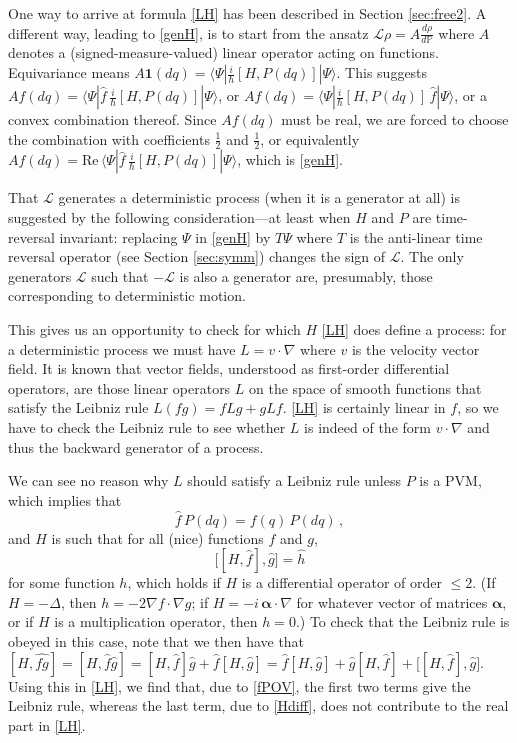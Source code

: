 \documentclass[12pt]{article}
\newcommand{\I}{i} %
\newcommand{\1}{\mathbf{1}} %
\newcommand{\Laplace}{\Delta} %
\renewcommand{\Re}{\mathrm{Re}} %
\renewcommand{\sp}[2]{\langle #1 | #2 \rangle} %
\newcommand{\measure}{\mathbb{P}} %
\newcommand{\generator}{\mathscr{L}} %
\newcommand{\pov}{{P}}%
\newcommand{\valpha}{{\boldsymbol \alpha}}
\begin{document}
  One way to arrive at formula \eqref{LH} has been described in Section
\ref{sec:free2}.  A different way, leading to \eqref{genH}, is to
start from the ansatz $\generator \rho = A\frac{d\rho}{d\measure}$
where $A$ denotes a (signed-measure-valued) linear operator acting on
functions.  Equivariance means $A\1 (dq) = \sp{\Psi}{\frac{\I}{\hbar}
[H, \pov(dq)] |\Psi}$.  This suggests $Af(dq) = \sp{\Psi}{\hat{f}\,
\frac{\I}{\hbar} [H, \pov(dq)] |\Psi}$, or $Af(dq) =
\sp{\Psi}{\frac{\I}{\hbar} [H, \pov(dq)]\, \hat{f} |\Psi}$, or a
convex combination thereof.  Since $Af(dq)$ must be real, we are
forced to choose the combination with coefficients $\frac{1}{2}$ and
$\frac{1}{2}$, or equivalently $Af(dq) = \Re\, \sp{\Psi}{\hat{f}\,
\frac{\I}{\hbar} [H, \pov(dq)] |\Psi}$, which is \eqref{genH}.

That $\generator$ generates a deterministic process (when it is a
generator at all) is suggested by the following consideration---at
least when $H$ and $\pov$ are time-reversal invariant: replacing
$\Psi$ in \eqref{genH} by $T\Psi$ where $T$ is the anti-linear time
reversal operator (see Section \ref{sec:symm}) changes the sign of
$\generator$. The only generators $\generator$ such that $-\generator$
is also a generator are, presumably, those corresponding to
deterministic motion.

This gives us an opportunity to check for which $H$ \eqref{LH} does
define a process: for a deterministic process we must have $L = v\cdot
\nabla$ where $v$ is the velocity vector field.  It is known that
vector fields, understood as first-order differential operators, are
those linear operators $L$ on the space of smooth functions that
satisfy the Leibniz rule $L(fg) = fLg + gLf$.  \eqref{LH} is certainly
linear in $f$, so we have to check the Leibniz rule to see whether $L$
is indeed of the form $v\cdot \nabla$ and thus the backward generator
of a process.

We can see no reason why $L$ should satisfy a Leibniz rule unless
$\pov$ is a PVM, which implies that
\begin{equation}\label{fPOV}
   \hat{f} \, \pov(dq) = f(q) \, \pov(dq)\,,
\end{equation}
and $H$ is such that for all (nice) functions $f$ and $g$,
\begin{equation}\label{Hdiff}
   \big[ [ H,\hat{f}] , \hat{g} \big] = \hat{h}
\end{equation}
for some function $h$, which holds if $H$ is a differential operator
of order $\leq 2$. (If $H=-\Laplace$, then $h=- 2 \nabla f \cdot
\nabla g$; if $H=-\I \, \valpha \cdot \nabla$ for whatever vector of
matrices $\valpha$, or if $H$ is a multiplication operator, then
$h=0$.)  To check that the Leibniz rule is obeyed in this case, note
that we then have  that $[H, \widehat{fg}] = [H, \hat{f} \hat{g}] =
[H,\hat{f}] \hat{g} + \hat{f} [H,\hat{g}] = \hat{f} [H, \hat{g}] +
\hat{g} [H, \hat{f}] + \big[ [H, \hat{f}], \hat{g} \big]$.  Using this
in \eqref{LH}, we find that, due to \eqref{fPOV}, the first two terms
give the Leibniz rule, whereas the last term, due to \eqref{Hdiff},
does not contribute to the real part in \eqref{LH}.
\end{document}
